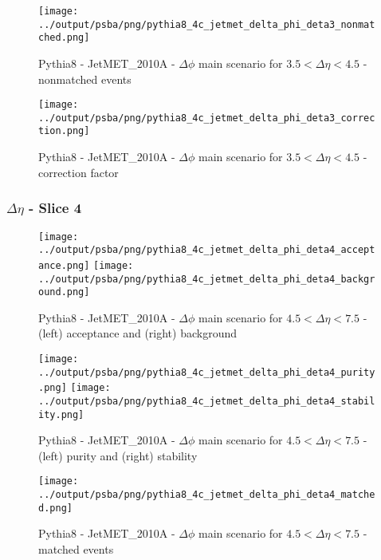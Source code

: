 \documentclass[11pt]{book}
\begin{document}
\begin{figure}[ht]
\centering
\texttt{[image: ../output/psba/png/pythia8\_4c\_jetmet\_delta\_phi\_deta3\_nonmatched.png]}
\caption{Pythia8 - JetMET\_2010A - $\Delta\phi$ main scenario for $3.5 < \Delta\eta < 4.5$ - nonmatched events}
\label{fig:p8_jetmet_delta_phi_deta3_nonmatched}
\end{figure}

\begin{figure}[ht]
\centering
\texttt{[image: ../output/psba/png/pythia8\_4c\_jetmet\_delta\_phi\_deta3\_correction.png]}
\caption{Pythia8 - JetMET\_2010A - $\Delta\phi$ main scenario for $3.5 < \Delta\eta < 4.5$ - correction factor}
\label{fig:p8_jetmet_delta_phi_deta3_correction}
\end{figure}


\clearpage
\subsubsection{$\Delta\eta$ - Slice 4}

\begin{figure}[ht]
\centering
\texttt{[image: ../output/psba/png/pythia8\_4c\_jetmet\_delta\_phi\_deta4\_acceptance.png]}
\texttt{[image: ../output/psba/png/pythia8\_4c\_jetmet\_delta\_phi\_deta4\_background.png]}
\caption{Pythia8 - JetMET\_2010A - $\Delta\phi$ main scenario for $4.5 < \Delta\eta < 7.5$ - (left) acceptance and (right) background}
\label{fig:p8_jetmet_delta_phi_deta4_ab}
\end{figure}

\begin{figure}[ht]
\centering
\texttt{[image: ../output/psba/png/pythia8\_4c\_jetmet\_delta\_phi\_deta4\_purity.png]}
\texttt{[image: ../output/psba/png/pythia8\_4c\_jetmet\_delta\_phi\_deta4\_stability.png]}
\caption{Pythia8 - JetMET\_2010A - $\Delta\phi$ main scenario for $4.5 < \Delta\eta < 7.5$ - (left) purity and (right) stability}
\label{fig:p8_jetmet_delta_phi_deta4_ps}
\end{figure}

\begin{figure}[ht]
\centering
\texttt{[image: ../output/psba/png/pythia8\_4c\_jetmet\_delta\_phi\_deta4\_matched.png]}
\caption{Pythia8 - JetMET\_2010A - $\Delta\phi$ main scenario for $4.5 < \Delta\eta < 7.5$ - matched events}
\label{fig:p8_jetmet_delta_phi_deta4_matched}
\end{figure}
\end{document}
